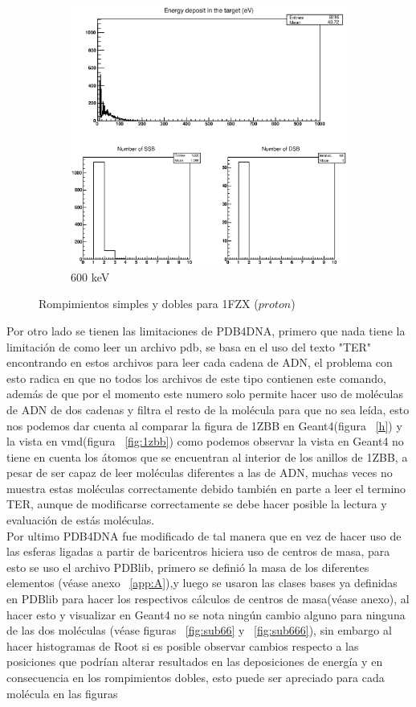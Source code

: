 \begin{figure}
\begin{subfigure}{.5\textwidth}
  \includegraphics[width=.78\linewidth]{./Figures/88.eps}
  \caption{600 keV}
  \label{fig:subi8}
\end{subfigure}
\caption{Rompimientos simples y dobles para 1FZX ($proton$)}
\label{fig:p2}
\end{figure}

Por otro lado se tienen las limitaciones de PDB4DNA, primero que nada tiene la limitación de como leer un archivo pdb, se basa en el uso del texto "TER" encontrando en estos archivos para leer cada cadena de ADN, el problema con esto radica en que no todos los archivos de este tipo contienen este comando, además de que por el momento este numero solo permite hacer uso de moléculas de ADN de dos cadenas y filtra el resto de la molécula para que no sea leída, esto nos podemos dar cuenta al comparar la figura de 1ZBB en Geant4(figura ~\ref{h}) y la vista en vmd(figura ~\ref{fig:1zbb}) como podemos observar la vista en Geant4 no tiene en cuenta los átomos que se encuentran al interior de los anillos de 1ZBB, a pesar de ser capaz de leer moléculas diferentes a las de ADN, muchas veces no muestra estas moléculas correctamente debido también en parte a leer el termino TER, aunque de modificarse correctamente se debe hacer posible la lectura y evaluación de estás moléculas.\\


Por ultimo PDB4DNA fue modificado de tal manera que en vez de hacer uso de las esferas ligadas a partir de baricentros hiciera uso de centros de masa, para esto se uso el archivo PDBlib, primero se definió la masa de los diferentes elementos (véase anexo ~\ref{app:A}),y luego se usaron las clases bases ya definidas en PDBlib para hacer los respectivos cálculos de centros de masa(véase anexo), al hacer esto y visualizar en Geant4 no se nota ningún cambio alguno para ninguna de las dos moléculas (véase figuras ~\ref{fig:sub66} y ~\ref{fig:sub666}), sin embargo al hacer histogramas de Root si es posible observar cambios respecto a las posiciones que podrían alterar resultados en las deposiciones de energía y en consecuencia en los rompimientos dobles, esto puede ser apreciado para cada molécula en las figuras

